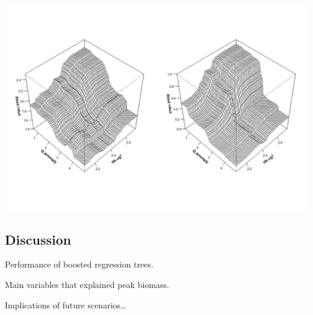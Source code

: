 \documentclass[
]{article}
\let\origfigure\figure
\let\endorigfigure\endfigure
\renewenvironment{figure}[1][2] {
    \expandafter\origfigure\expandafter[H]
} {
    \endorigfigure
}
\begin{document}
\begin{figure}
\includegraphics[width=1\linewidth]{Manuscript_files/FIGURES/Interaction_Plots} \caption{A caption}\label{fig:unnamed-chunk-6}
\end{figure}

\hypertarget{discussion}{%
\subsection{Discussion}\label{discussion}}

Performance of boosted regression trees.

Main variables that explained peak biomass.

Implications of future scenarios\ldots{}
\end{document}
